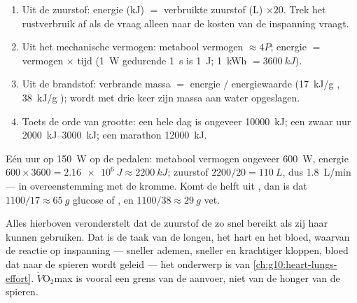 \begin{method}\label{met:g10:exercise-and-energy:calc}
\begin{enumerate}
  \item Uit de zuurstof: energie (\unit{kJ}) $=$ verbruikte zuurstof
        (\unit{L}) $\times 20$. Trek het rustverbruik af als de vraag
        alleen naar de kosten van de inspanning vraagt.
  \item Uit het mechanische vermogen: metabool vermogen $\approx 4 P$;
        energie $=$ vermogen $\times$ tijd (\qty{1}{W} gedurende
        \qty{1}{s} is \qty{1}{J}; \qty{1}{kWh} $= \qty{3600}{kJ}$).
  \item Uit de brandstof: verbrande massa $=$ energie $/$ energiewaarde
        (\qty{17}{kJ/g} , \qty{38}{kJ/g} ); 
        wordt met drie keer zijn massa aan water opgeslagen.
  \item Toets de orde van grootte: een hele dag is ongeveer
        \qty{10000}{kJ}; een zwaar uur \qtyrange{2000}{3000}{kJ}; een
        marathon \qty{12000}{kJ}.
\end{enumerate}
\end{method}

\begin{example}\label{ex:g10:exercise-and-energy:hour}
Eén uur op \qty{150}{W} op de pedalen: metabool vermogen ongeveer
\qty{600}{W}, energie $600 \times 3600 = \qty{2.16e6}{J} \approx
\qty{2200}{kJ}$; zuurstof $2200/20 = \qty{110}{L}$, dus
\qty{1.8}{L/min} --- in overeenstemming met de kromme. Komt de helft uit
, dan is dat $1100/17 \approx \qty{65}{g}$ glucose of
, en $1100/38 \approx \qty{29}{g}$ vet.
\end{example}

\begin{remark}\label{rem:g10:exercise-and-energy:delivery}
Alles hierboven veronderstelt dat de zuurstof de  zo snel
bereikt als zij haar kunnen gebruiken. Dat is de taak van de longen, het
hart en het bloed, waarvan de reactie op inspanning --- sneller ademen,
sneller en krachtiger kloppen, bloed dat naar de spieren wordt geleid ---
het onderwerp is van \cref{ch:g10:heart-lungs-effort}.
$\dot V\!\mathrm{O_2}$max is vooral een grens van de aanvoer, niet van de
honger van de spieren.
\end{remark}

